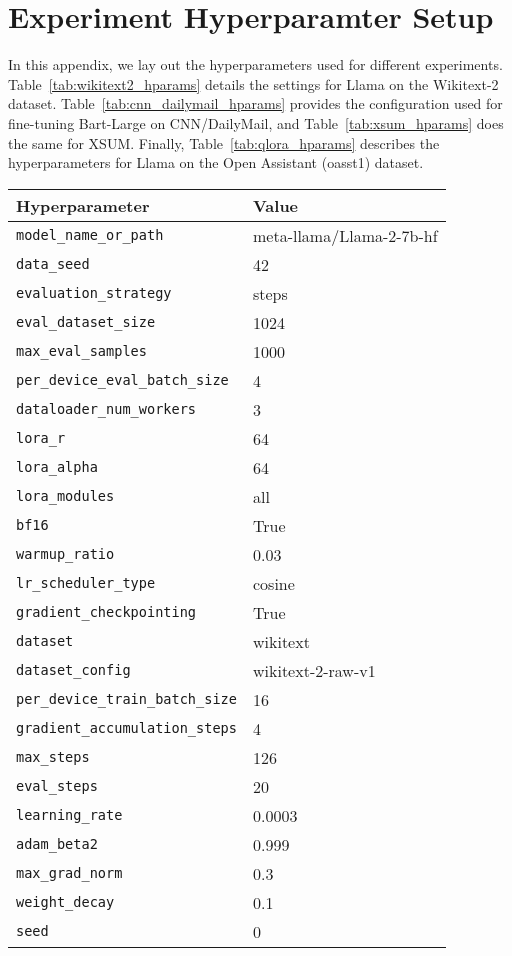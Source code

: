 

\section{Experiment Hyperparamter Setup}\label{app:hyperparams}

In this appendix, we lay out the hyperparameters used for different experiments. Table~\ref{tab:wikitext2_hparams} details the settings for Llama on the Wikitext-2 dataset. Table~\ref{tab:cnn_dailymail_hparams} provides the configuration used for fine-tuning Bart-Large on CNN/DailyMail, and Table~\ref{tab:xsum_hparams} does the same for XSUM. Finally, Table~\ref{tab:qlora_hparams} describes the hyperparameters for Llama on the Open Assistant (oasst1) dataset.
\begin{table}[ht]
\centering
\begin{tabular}{ll}
\toprule
\textbf{Hyperparameter} & \textbf{Value} \\
\midrule
\texttt{model\_name\_or\_path} & meta-llama/Llama-2-7b-hf \\
\texttt{data\_seed}            & 42 \\
\texttt{evaluation\_strategy}  & steps \\
\texttt{eval\_dataset\_size}   & 1024 \\
\texttt{max\_eval\_samples}    & 1000 \\
\texttt{per\_device\_eval\_batch\_size} & 4 \\
\texttt{dataloader\_num\_workers} & 3 \\
\texttt{lora\_r}               & 64 \\
\texttt{lora\_alpha}           & 64 \\
\texttt{lora\_modules}         & all \\
\texttt{bf16}                  & True \\
\texttt{warmup\_ratio}         & 0.03 \\
\texttt{lr\_scheduler\_type}   & cosine \\
\texttt{gradient\_checkpointing} & True \\
\texttt{dataset}               & wikitext \\
\texttt{dataset\_config}       & wikitext-2-raw-v1 \\
\texttt{per\_device\_train\_batch\_size} & 16 \\
\texttt{gradient\_accumulation\_steps}   & 4 \\
\texttt{max\_steps}            & 126 \\
\texttt{eval\_steps}           & 20 \\
\texttt{learning\_rate}        & 0.0003 \\
\texttt{adam\_beta2}           & 0.999 \\
\texttt{max\_grad\_norm}       & 0.3 \\
\texttt{weight\_decay}         & 0.1 \\
\texttt{seed}                  & 0 \\



\end{tabular}
\end{table}
